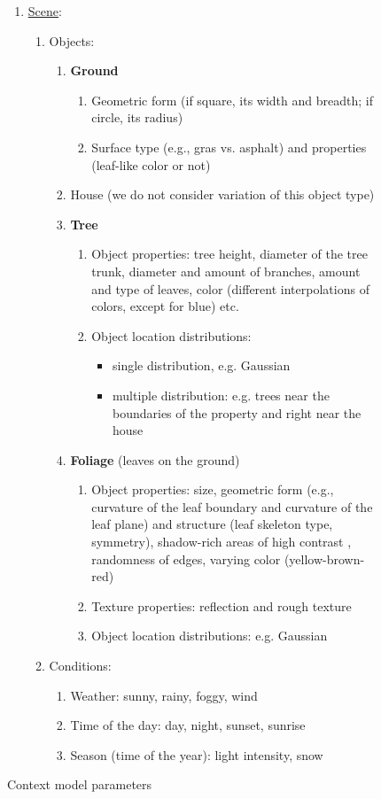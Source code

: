 \documentclass[fleqn,10pt]{SelfArx} %
\begin{document}
\begin{figure}[ht!]
\begin{enumerate}[nolistsep]
  \item \underline{Scene}:
    \begin{enumerate}[nolistsep]
     \item Objects:
	\begin{enumerate}[nolistsep]
	    \item \textbf{Ground}
	      \begin{enumerate}[nolistsep]
		\item Geometric form (if square, its width and breadth; if circle, its radius)
		\item Surface type (e.g., gras vs. asphalt) and properties (leaf-like color or not)
	      \end{enumerate}
	    \item House (we do not consider variation of this object type)
	    \item \textbf{Tree}
	      \begin{enumerate}[nolistsep]
		\item Object properties: tree height, diameter of the tree trunk, diameter and amount of branches, amount and type of leaves, color (different interpolations of colors, except for blue) etc. 
		\item Object location distributions: 
		\begin{itemize}
		    \item single distribution, e.g. Gaussian
		    \item multiple distribution: e.g. trees near the boundaries of the property and right near the house
		\end{itemize}
	    \end{enumerate}
	    \item \textbf{Foliage} (leaves on the ground)
	      \begin{enumerate}[nolistsep]
		\item Object properties: size, geometric form (e.g., curvature of the leaf boundary and curvature of the leaf plane) and structure (leaf skeleton type, symmetry), shadow-rich areas of high contrast \cite{Hamme:2008}, randomness of edges, varying color (yellow-brown-red)
		\item Texture properties: reflection and rough texture
		\item Object location distributions: e.g. Gaussian
	      \end{enumerate}
	\end{enumerate}
    \item Conditions: 
      \begin{enumerate}[nolistsep]
		\item Weather: sunny, rainy, foggy, wind
		\item Time of the day: day, night, sunset, sunrise
		\item Season (time of the year): light intensity, snow
      \end{enumerate}
    \end{enumerate}

\end{enumerate}
\caption{Context model parameters}
\label{fig:context}
\end{figure}
\end{document}
